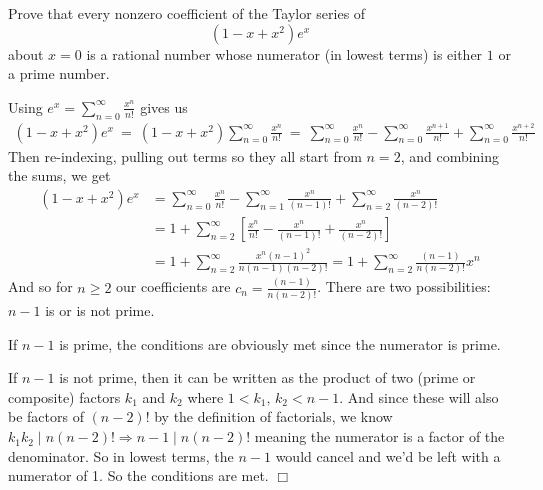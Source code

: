 



\parindent 0pt
\marginparsep 3pt




\sloppy
\thispagestyle{firstpageheader}



\begin{problem}[D][7][Putnam 2014 A1]
Prove that every nonzero coefficient of the Taylor series of 
\[
(1 - x + x^2)e^x
\]
about $x = 0$ is a rational number whose numerator (in lowest terms) is either $1$ or a prime number.
\end{problem}

\begin{solution}
    Using $\displaystyle e^x=\sum_{n=0}^\infty \frac{x^n}{n!}$ gives us
    \begin{align*}
        (1 - x + x^2)e^x \ = \ (1 - x + x^2)\sum_{n=0}^\infty \frac{x^n}{n!} \ = \ \sum_{n=0}^\infty \frac{x^n}{n!} - \sum_{n=0}^\infty \frac{x^{n+1}}{n!} + \sum_{n=0}^\infty\frac{x^{n+2}}{n!}
    \end{align*}
    Then re-indexing, pulling out terms so they all start from $n=2$, and combining the sums, we get
    \begin{align*}
        (1 - x + x^2)e^x &= \sum_{n=0}^\infty \frac{x^n}{n!} - \sum_{n=1}^\infty \frac{x^{n}}{(n-1)!} + \sum_{n=2}^\infty\frac{x^{n}}{(n-2)!}\\
        &= 1 + \sum_{n=2}^\infty \left[\frac{x^n}{n!} - \frac{x^{n}}{(n-1)!} + \frac{x^{n}}{(n-2)!}\right]\\
        &= 1 + \sum_{n=2}^\infty \frac{x^n(n-1)^2}{n(n-1)(n-2)!} = 1 + \sum_{n=2}^\infty \frac{(n-1)}{n(n-2)!}x^n
    \end{align*}
    And so for $n \geq 2$ our coefficients are $c_n=\frac{(n-1)}{n(n-2)!}$. There are two possibilities: $n-1$ is or is not prime.
    
    If $n-1$ is prime, the conditions are obviously met since the numerator is prime.
    
    If $n-1$ is not prime, then it can be written as the product of two (prime or composite) factors $k_1$ and $k_2$ where $1 < k_1,\, k_2 < n-1$. And since these will also be factors of $(n-2)!$ by the definition of factorials, we know $k_1k_2 \mid n(n-2)! \Rightarrow n-1 \mid n(n-2)!$ meaning the numerator is a factor of the denominator. So in lowest terms, the $n-1$ would cancel and we'd be left with a numerator of 1. So the conditions are met. $\Box$
\end{solution}

